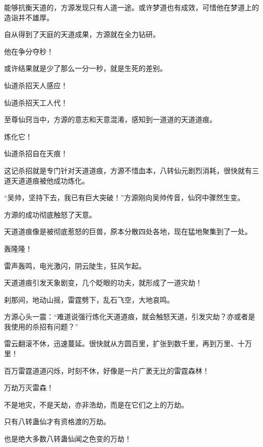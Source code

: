 \begin{this_body}
能够抗衡天道的，方源发现只有人道一途。或许梦道也有成效，可惜他在梦道上的造诣并不雄厚。

自从得到了天庭的天道成果，方源就在全力钻研。

他在争分夺秒！

或许结果就是少了那么一分一秒，就是生死的差别。

仙道杀招天人感应！

仙道杀招天工人代！

至尊仙窍当中，方源的意志和天意混淆，感知到一道道的天道道痕。

炼化它！

仙道杀招自在天痕！

这记杀招就是专门针对天道道痕，方源不惜血本，八转仙元剧烈消耗，很快就有三道天道道痕被他成功炼化。

“吴帅，坚持下去，我已有巨大突破！”方源刚向吴帅传音，仙窍中骤然生变。

方源的成功彻底触怒了天意。

天道道痕像是被彻底惹怒的巨兽，原本分散四处各地，现在猛地聚集到了一处。

轰隆隆！

雷声轰鸣，电光激闪，阴云陡生，狂风乍起。

天道道痕引发天象剧变，几个眨眼的功夫，就形成了一道灾劫！

刹那间，地动山摇，雷霆劈下，乱石飞空，大地哀鸣。

方源心头一震：“难道说强行炼化天道道痕，就会触怒天道，引发灾劫？亦或者是我使用的杀招有问题？”

雷云翻滚不休，迅速蔓延。很快就从方圆百里，扩张到数千里，再到万里、十万里！

百万雷霆道道闪烁，时刻不休，好像是一片广袤无比的雷霆森林！

万劫万灭雷森！

不是地灾，不是天劫，亦非浩劫，而是在它们之上的万劫。

只有八转蛊仙才有资格渡的万劫。

也是绝大多数八转蛊仙闻之色变的万劫！

\end{this_body}

